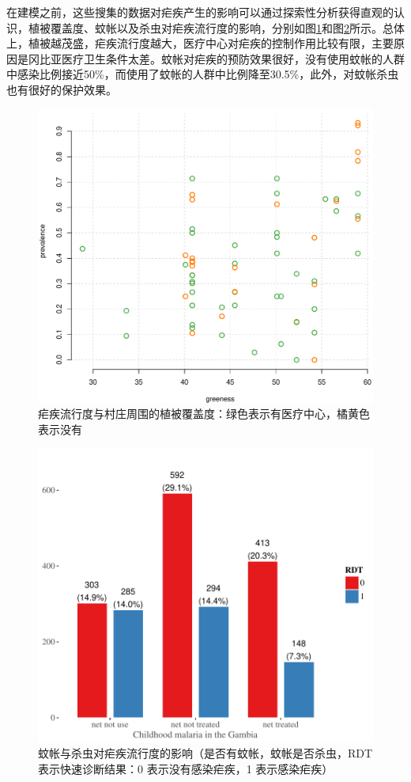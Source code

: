 \documentclass[hyperref, a4paper, UTF8, zihao = -4, linespread = 1.25, scheme = chinese]{ctexbook}
\begin{document}
在建模之前，这些搜集的数据对疟疾产生的影响可以通过探索性分析获得直观的认识，植被覆盖度、蚊帐以及杀虫对疟疾流行度的影响，分别如图\ref{fig:gambia-prevalence}和图\ref{fig:bed-net}所示。总体上，植被越茂盛，疟疾流行度越大，医疗中心对疟疾的控制作用比较有限，主要原因是冈比亚医疗卫生条件太差。蚊帐对疟疾的预防效果很好，没有使用蚊帐的人群中感染比例接近50\%，而使用了蚊帐的人群中比例降至30.5\%，此外，对蚊帐杀虫也有很好的保护效果。

\begin{figure}

{\centering \includegraphics[width=0.6\linewidth]{figures/gambia-prevalence} 

}

\caption{疟疾流行度与村庄周围的植被覆盖度：绿色表示有医疗中心，橘黄色表示没有}\label{fig:gambia-prevalence}
\end{figure}
\begin{figure}

{\centering \includegraphics[width=0.6\linewidth]{figures/gambia-bed-net} 

}

\caption{蚊帐与杀虫对疟疾流行度的影响（是否有蚊帐，蚊帐是否杀虫，RDT 表示快速诊断结果：0 表示没有感染疟疾，1 表示感染疟疾）}\label{fig:bed-net}
\end{figure}
\end{document}
